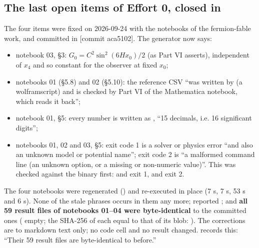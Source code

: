 \subsection{The last open items of Effort 0, closed in \texorpdfstring{}{aca5102}}
\label{sec:2.5}

The four  items were fixed on 2026-09-24 with the notebooks of the fermion-fable work, and committed in  [commit aca5102]. The generator now says:

\begin{itemize}
  \item notebook 03, \S{}3: $G_0=C^2\sin^2(6Hx_0)/2$ (as Part VI asserts), independent of $x_{4}$ and so constant for the observer at fixed $x_{0}$;
  \item notebooks 01 (\S{}5.8) and 02 (\S{}5.10): the reference CSV ``was written by  (a wolframscript) and is checked by Part VI of the Mathematica notebook, which reads it back'';
  \item notebook 01, \S{}5: every number is written as , ``15 decimals, i.e. 16 significant digits'';
  \item notebooks 01, 02 and 03, \S{}5: exit code 1 is a solver or physics error ``and also an unknown model or potential name''; exit code 2 is ``a malformed command line (an unknown option, or a missing or non-numeric value)''. This was checked against the binary first:  and  exit 1,  and  exit 2.
\end{itemize}

The four notebooks were regenerated () and re-executed in place (7 s, 7 s, 53 s and 6 s). None of the stale phrases occurs in them any more;  reported ; and \textbf{all 59 result files of notebooks 01--04 were byte-identical} to the committed ones ( empty; the SHA-256 of each equal to that of its  blob: ). The corrections are to markdown text only; no code cell and no result changed.  records this: ``Their 59 result files are byte-identical to before.''

